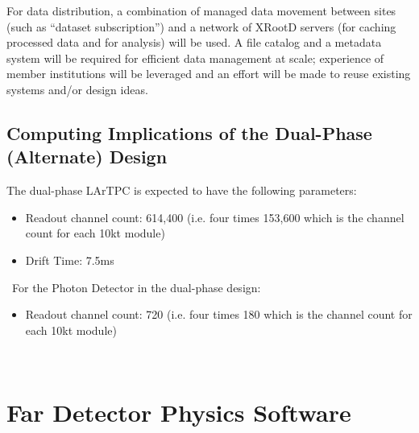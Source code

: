 For data distribution, a combination of managed data movement between sites (such as ``dataset subscription'')
and a network of XRootD servers (for caching processed data and for analysis) will be used.
A file catalog and a metadata system will be required for efficient data management at scale; %
experience of
member institutions will be leveraged and %
an effort will be made to reuse existing systems and/or design ideas. %

\subsection{Computing Implications of the Dual-Phase (Alternate) Design}
\label{sec:detectors-sc-alternate}
The dual-phase LArTPC is expected to have the following parameters:
\begin{itemize}
	\item Readout channel count: 614,400 (i.e. four times 153,600 which is the channel count
	for each 10kt module)
	\item Drift Time: 7.5ms
\end{itemize}
\
For the Photon Detector in the dual-phase design:
\begin{itemize}
	\item Readout channel count: 720 (i.e. four times 180 which is the channel count
	for each 10kt module)
\end{itemize}
\
\section{Far Detector Physics Software}
\label{sec:detectors-sc-physics-software}



